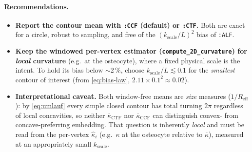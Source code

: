 \documentclass[11pt]{article}
\newcommand{\kbar}{\overline{\kappa}}
\newcommand{\code}[1]{\texttt{#1}}
\begin{document}
\paragraph{Recommendations.}
\begin{itemize}
  \item \textbf{Report the contour mean with \code{:CCF} (default) or \code{:CTF}.}
    Both are exact for a circle, robust to sampling, and free of the
    $(k_{\text{scale}}/L)^2$ bias of \code{:ALF}.
  \item \textbf{Keep the windowed per-vertex estimator
    (\code{compute\_2D\_curvature}) for \emph{local} curvature} (e.g.\ at the
    osteocyte), where a fixed physical scale is the intent. To hold its bias below
    $\sim\!2\,\%$, choose $k_{\text{scale}}/L \lesssim 0.1$ for the
    \emph{smallest} contour of interest (from \eqref{eq:bias-law},
    $2.11\times0.1^2\approx0.02$).
  \item \textbf{Interpretational caveat.} Both window-free means are \emph{size}
    measures ($1/R_{\text{eff}}$): by \eqref{eq:umlauf} every simple closed
    contour has total turning $2\pi$ regardless of local concavities, so neither
    $\kbar_{\text{CTF}}$ nor $\kbar_{\text{CCF}}$ can distinguish convex- from
    concave-preferring embedding. That question is inherently \emph{local} and
    must be read from the per-vertex $\widehat{\kappa}_i$ (e.g.\ $\kappa$ at the
    osteocyte relative to $\kbar$), measured at an appropriately small
    $k_{\text{scale}}$.
\end{itemize}
\end{document}

